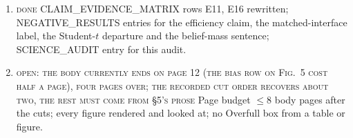 \begin{enumerate}[label=$\square$, leftmargin=1.6em]
\item \textsc{done} CLAIM\_EVIDENCE\_MATRIX rows E11, E16 rewritten; NEGATIVE\_RESULTS entries for the efficiency claim, the matched-interface label, the Student-$t$ departure and the belief-mass sentence; SCIENCE\_AUDIT entry for this audit.
\item \textsc{open: the body currently ends on page 12 (the bias row on Fig.~5 cost half a page), four pages over; the recorded cut order recovers about two, the rest must come from \S5's prose} Page budget $\le8$ body pages after the cuts; every figure rendered and looked at; no Overfull box from a table or figure.
\end{enumerate}
